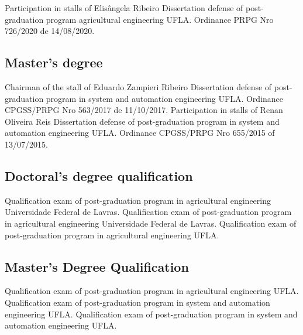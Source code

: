 \documentclass[11pt,a4paper,sans]{moderncv} %
\begin{document}
			{Participation in stalls of Elisângela Ribeiro}
			{Dissertation defense of post-graduation program agricultural engineering}{}
			{UFLA. Ordinance PRPG Nro 726/2020 de 14/08/2020.}
			
\subsection{Master's degree}
			{Chairman of the stall of Eduardo Zampieri Ribeiro}
			{Dissertation defense of post-graduation program  in system and automation engineering }{}
			{UFLA. Ordinance CPGSS/PRPG Nro 563/2017 de 11/10/2017.}
			{Participation in stalls of Renan Oliveira Reis}
			{Dissertation defense of post-graduation program  in system and automation engineering }{}
			{UFLA. Ordinance CPGSS/PRPG Nro 655/2015 of 13/07/2015.}

\subsection{Doctoral's degree qualification}
			{}
			{Qualification exam of post-graduation program  in agricultural engineering}{}
			{Universidade Federal de Lavras.}
			{}
			{Qualification exam of post-graduation program  in agricultural engineering}{}
			{Universidade Federal de Lavras.}
			{}
			{Qualification exam of post-graduation program  in agricultural engineering}{}
			{UFLA. }

\subsection{Master's Degree Qualification}
			{}
			{Qualification exam of post-graduation program  in agricultural engineering}{}
			{UFLA.}
			{}
			{Qualification exam of post-graduation program  in system and automation engineering}{}
			{UFLA.}
			{}
			{Qualification exam of post-graduation program  in system and automation engineering}{}
			{UFLA. }
\end{document}

